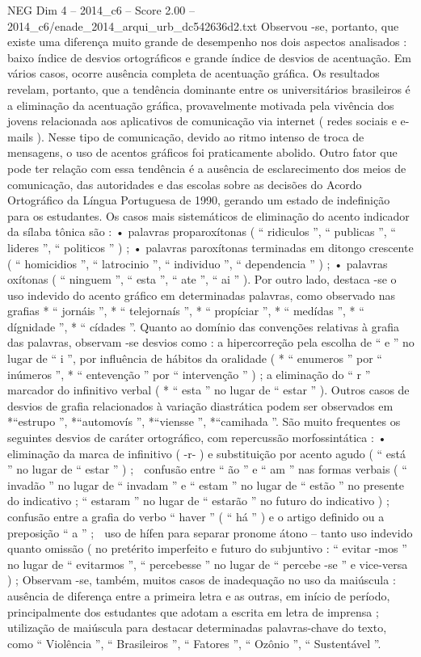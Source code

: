 \begin{textsample}{NEG Dim 4 – 2014\_c6 – Score 2.00 – 2014\_c6/enade\_2014\_arqui\_urb\_dc542636d2.txt}
Observou -se, portanto, que existe uma diferença muito grande de desempenho nos dois aspectos analisados : baixo índice de desvios ortográficos e grande índice de desvios de acentuação.
Em vários casos, ocorre ausência completa de acentuação gráfica.
Os resultados revelam, portanto, que a tendência dominante entre os universitários brasileiros é a eliminação da acentuação gráfica, provavelmente motivada pela vivência dos jovens relacionada aos aplicativos de comunicação via internet ( redes sociais e e-mails ).
Nesse tipo de comunicação, devido ao ritmo intenso de troca de mensagens, o uso de acentos gráficos foi praticamente abolido.
Outro fator que pode ter relação com essa tendência é a ausência de esclarecimento dos meios de comunicação, das autoridades e das escolas sobre as decisões do Acordo Ortográfico da Língua Portuguesa de 1990, gerando um estado de indefinição para os estudantes.
Os casos mais sistemáticos de eliminação do acento indicador da sílaba tônica são : • palavras proparoxítonas ( “ ridiculos ”, “ publicas ”, “ lideres ”, “ politicos ” ) ; • palavras paroxítonas terminadas em ditongo crescente ( “ homicidios ”, “ latrocinio ”, “ individuo ”, “ dependencia ” ) ; • palavras oxítonas ( “ ninguem ”, “ esta ”, “ ate ”, “ ai ” ).
Por outro lado, destaca -se o uso indevido do acento gráfico em determinadas palavras, como observado nas grafias * “ jornáis ”, * “ telejornaís ”, * “ propíciar ”, * “ medídas ”, * “ dígnidade ”, * “ cídades ”.
Quanto ao domínio das convenções relativas à grafia das palavras, observam -se desvios como : a hipercorreção pela escolha de “ e ” no lugar de “ i ”, por influência de hábitos da oralidade ( * “ enumeros ” por “ inúmeros ”, * “ entevenção ” por “ intervenção ” ) ; a eliminação do “ r ” marcador do infinitivo verbal ( * “ esta ” no lugar de “ estar ” ).
Outros casos de desvios de grafia relacionados à variação diastrática podem ser observados em *“estrupo ”, *“automovís ”, *“viensse ”, *“camihada ”.
São muito frequentes os seguintes desvios de caráter ortográfico, com repercussão morfossintática : • eliminação da marca de infinitivo ( -r- ) e substituição por acento agudo ( “ está ” no lugar de “ estar ” ) ;  confusão entre “ ão ” e “ am ” nas formas verbais ( “ invadão ” no lugar de “ invadam ” e “ estam ” no lugar de “ estão ” no presente do indicativo ; “ estaram ” no lugar de “ estarão ” no futuro do indicativo ) ;  confusão entre a grafia do verbo “ haver ” ( “ há ” ) e o artigo definido ou a preposição “ a ” ;  uso de hífen para separar pronome átono – tanto uso indevido quanto omissão ( no pretérito imperfeito e futuro do subjuntivo : “ evitar -mos ” no lugar de “ evitarmos ”, “ percebesse ” no lugar de “ percebe -se ” e vice-versa ) ; Observam -se, também, muitos casos de inadequação no uso da maiúscula : ausência de diferença entre a primeira letra e as outras, em início de período, principalmente dos estudantes que adotam a escrita em letra de imprensa ; utilização de maiúscula para destacar determinadas palavras-chave do texto, como “ Violência ”, “ Brasileiros ”, “ Fatores ”, “ Ozônio ”, “ Sustentável ”.

\end{textsample}
